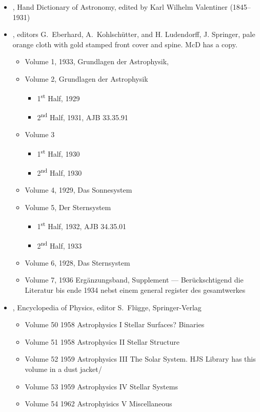 \documentclass{article}
\begin{document}
\begin{itemize}
\item {}, Hand Dictionary of Astronomy, edited by Karl Wilhelm Valentiner (1845--1931)

\item {}, editors G.\ Eberhard, A.\ Kohlsch\"{u}tter, and H. Ludendorff, J. Springer, pale orange cloth with gold stamped front cover and spine. McD has a copy.
  \begin{itemize}
  \item Volume 1, 1933, Grundlagen der Astrophysik,
  \item Volume 2, Grundlagen der Astrophysik
    \begin{itemize}
    \item 1\textsuperscript{st} Half, 1929
    \item 2\textsuperscript{nd} Half, 1931, AJB 33.35.91
    \end{itemize}
  \item Volume 3
    \begin{itemize}
    \item 1\textsuperscript{st} Half, 1930
    \item 2\textsuperscript{nd} Half, 1930
    \end{itemize}
  \item Volume 4, 1929,  Das Sonnesystem
  \item Volume 5, Der Sternsystem
    \begin{itemize}
    \item 1\textsuperscript{st} Half, 1932, AJB 34.35.01
    \item 2\textsuperscript{nd} Half, 1933
    \end{itemize}
  \item Volume 6, 1928, Das Sternsystem
  \item Volume 7, 1936 Erg\"{a}nzungsband, Supplement --- Ber\"{u}ckschtigend die Literatur bis ende 1934 nebst einem general register des gesamtwerkes
  \end{itemize}

\item {}, Encyclopedia of Physics, editor S.\ Fl\"{u}gge, Springer-Verlag
  \begin{itemize}
  \item Volume 50 1958 Astrophysics I Stellar Surfaces? Binaries
  \item Volume 51 1958 Astrophysics II Stellar Structure
  \item Volume 52 1959 Astrophysics III The Solar System. HJS Library has this volume in a dust jacket/
  \item Volume 53 1959 Astrophysics IV Stellar Systems
  \item Volume 54 1962 Astrophyisics V Miscellaneous
  \end{itemize}


\end{itemize}
\end{document}
